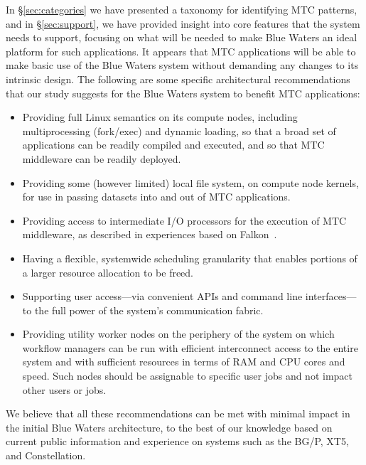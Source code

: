 \documentclass[10pt,letterpaper]{article}
\begin{document}
In \S\ref{sec:categories} we have presented a taxonomy for identifying MTC patterns,
and in \S\ref{sec:support}, we have provided insight into core features
that the system needs to support,
focusing on what will be needed to make Blue Waters
an ideal platform for such applications.
It appears that MTC applications will be able to make basic use of the Blue Waters system without demanding any changes to its intrinsic design.
The following are some specific architectural recommendations that our study suggests for the Blue Waters system to benefit MTC applications:
\begin{itemize}
\item
Providing full Linux semantics on its compute nodes, including multiprocessing (fork/exec) and dynamic loading, so that a broad set of applications can be readily compiled and executed, and so that MTC middleware can be readily deployed.
\item Providing some (however limited)  local file system, on compute node kernels, for use in passing datasets into and out of MTC applications.
\item Providing access to intermediate I/O processors for the execution of MTC middleware, as described in experiences based on Falkon~\cite{FALKON-SC-08}.
\item Having a flexible, systemwide scheduling granularity that enables portions of a larger resource allocation to be freed.
\item Supporting user access---via convenient APIs and command line interfaces---to the full power of the system's communication fabric. 
\item Providing utility worker nodes on the periphery of the system on which workflow managers can be run with efficient interconnect access to the entire system and with sufficient resources in terms of RAM and CPU cores and speed. Such nodes should be assignable to specific user jobs and not impact other users or jobs.
\end{itemize}
We believe that all these recommendations can be met with minimal impact in the initial Blue Waters architecture, to the best of our knowledge based on current public information and experience on systems such as the BG/P, XT5, and Constellation.
\end{document}
